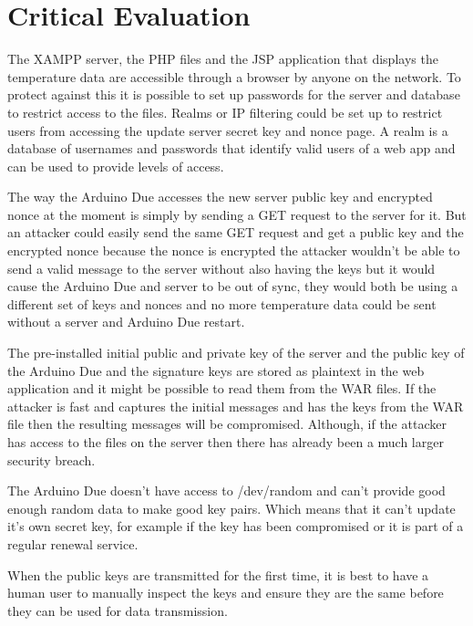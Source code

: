 \chapter{Critical Evaluation}
\label{crit}



The XAMPP server, the PHP files and the JSP application that displays the temperature data are accessible through a browser by anyone on the network. To protect against this it is possible to set up passwords for the server and database to restrict access to the files. Realms or IP filtering could be set up to restrict users from accessing the update server secret key and nonce page. A realm is a database of usernames and passwords that identify valid users of a web app and can be used to provide levels of access.

The way the Arduino Due accesses the new server public key and encrypted nonce at the moment is simply by sending a GET request to the server for it. But an attacker could easily send the same GET request and get a public key and the encrypted nonce because the nonce is encrypted the attacker wouldn't be able to send a valid message to the server without also having the keys but it would cause the Arduino Due and server to be out of sync, they would both be using a different set of keys and nonces and no more temperature data could be sent without a server and Arduino Due restart.

The pre-installed initial public and private key of the server and the public key of the Arduino Due and the signature keys are stored as plaintext in the web application and it might be possible to read them from the WAR files. If the attacker is fast and captures the initial messages and has the keys from the WAR file then the resulting messages will be compromised. Although, if the attacker has access to the files on the server then there has already been a much larger security breach.

The Arduino Due doesn't have access to /dev/random and can't provide good enough random data to make good key pairs. Which means that it can't update it's own secret key, for example if the key has been compromised or it is part of a regular renewal service.

When the public keys are transmitted for the first time, it is best to have a human user to manually inspect the keys and ensure they are the same before they can be used for data transmission. 

